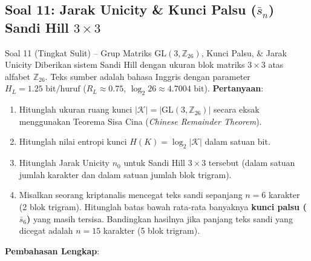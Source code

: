 \documentclass[11pt,a4paper]{article}
\begin{document}
\vspace{0.4cm}

\subsection{Soal 11: Jarak Unicity \& Kunci Palsu \texorpdfstring{($\bar{s}_n$)}{(s-n)} Sandi Hill \texorpdfstring{$3 \times 3$}{3x3}}

\begin{soalsulit}{Soal 11 (Tingkat Sulit) -- Grup Matriks $\mathrm{GL}(3, \mathbb{Z}_{26})$, Kunci Palsu, \& Jarak Unicity}
Diberikan sistem Sandi Hill dengan ukuran blok matriks $3 \times 3$ atas alfabet $\mathbb{Z}_{26}$. Teks sumber adalah bahasa Inggris dengan parameter $H_L = 1.25\text{ bit/huruf}$ ($R_L \approx 0.75$, $\log_2 26 \approx 4.7004\text{ bit}$).
\textbf{Pertanyaan}:
\begin{enumerate}[label=\alph*)]
    \item Hitunglah ukuran ruang kunci $|\mathcal{K}| = |\mathrm{GL}(3, \mathbb{Z}_{26})|$ secara eksak menggunakan Teorema Sisa Cina (\textit{Chinese Remainder Theorem}).
    \item Hitunglah nilai entropi kunci $H(K) = \log_2 |\mathcal{K}|$ dalam satuan bit.
    \item Hitunglah Jarak Unicity $n_0$ untuk Sandi Hill $3 \times 3$ tersebut (dalam satuan jumlah karakter dan dalam satuan jumlah blok trigram).
    \item Misalkan seorang kriptanalis mencegat teks sandi sepanjang $n = 6$ karakter (2 blok trigram). Hitunglah batas bawah rata-rata banyaknya \textbf{kunci palsu ($\bar{s}_6$)} yang masih tersisa. Bandingkan hasilnya jika panjang teks sandi yang dicegat adalah $n = 15$ karakter (5 blok trigram).
\end{enumerate}
\end{soalsulit}

\noindent\textbf{Pembahasan Lengkap}:
\end{document}
